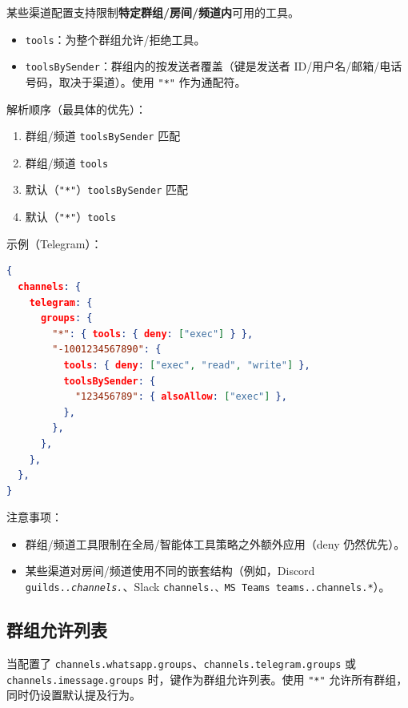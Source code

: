 某些渠道配置支持限制\textbf{特定群组/房间/频道内}可用的工具。

\begin{itemize}
  \item \texttt{tools}：为整个群组允许/拒绝工具。
  \item \texttt{toolsBySender}：群组内的按发送者覆盖（键是发送者 ID/用户名/邮箱/电话号码，取决于渠道）。使用 \texttt{"*"} 作为通配符。
\end{itemize}


解析顺序（最具体的优先）：

\begin{enumerate}
  \item 群组/频道 \texttt{toolsBySender} 匹配
  \item 群组/频道 \texttt{tools}
  \item 默认（\texttt{"*"}）\texttt{toolsBySender} 匹配
  \item 默认（\texttt{"*"}）\texttt{tools}
\end{enumerate}


示例（Telegram）：

\begin{lstlisting}[language=json]
{
  channels: {
    telegram: {
      groups: {
        "*": { tools: { deny: ["exec"] } },
        "-1001234567890": {
          tools: { deny: ["exec", "read", "write"] },
          toolsBySender: {
            "123456789": { alsoAllow: ["exec"] },
          },
        },
      },
    },
  },
}
\end{lstlisting}


注意事项：

\begin{itemize}
  \item 群组/频道工具限制在全局/智能体工具策略之外额外应用（deny 仍然优先）。
  \item 某些渠道对房间/频道使用不同的嵌套结构（例如，Discord \texttt{guilds.\textit{.channels.}}、Slack \texttt{channels.\textit{}、MS Teams \texttt{teams.}.channels.*}）。
\end{itemize}


\subsection{群组允许列表}


当配置了 \texttt{channels.whatsapp.groups}、\texttt{channels.telegram.groups} 或 \texttt{channels.imessage.groups} 时，键作为群组允许列表。使用 \texttt{"*"} 允许所有群组，同时仍设置默认提及行为。

